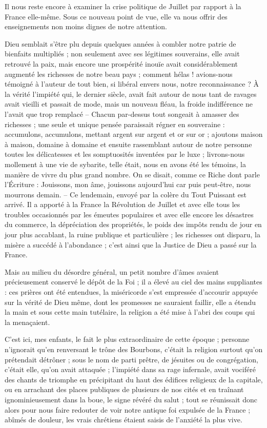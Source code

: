 \documentclass[11pt,a4paper]{report}
\begin{document}
Il nous reste encore à examiner la crise politique de Juillet par rapport à la France elle-même. Sous ce nouveau point de vue, elle va nous offrir des enseignements non moins dignes de notre attention.

Dieu semblait s'être plu depuis quelques années à combler notre patrie de bienfaits multipliés ; non seulement avec ses légitimes souverains, elle avait retrouvé la paix, mais encore une prospérité inouïe avait considérablement augmenté les richesses de notre beau pays ; comment hélas ! avions-nous témoigné à l'auteur de tout bien, si libéral envers nous, notre reconnaissance ? À la vérité l'impiété qui, le dernier siècle, avait fait autour de nous tant de ravages avait vieilli et passait de mode, mais un nouveau fléau, la froide indifférence ne l'avait que trop remplacé -- Chacun par-dessus tout songeait à amasser des richesses ; une seule et unique pensée paraissait régner en souveraine : accumulons, accumulons, mettant argent sur argent et or sur or ; ajoutons maison à maison, domaine à domaine et ensuite rassemblant autour de notre personne toutes les délicatesses et les somptuosités inventées par le luxe ; livrons-nous mollement à une vie de sybarite, telle était, nous en avons été les témoins, la manière de vivre du plus grand nombre. On se disait, comme ce Riche dont parle l'Écriture : Jouissons, mon âme, jouissons aujourd'hui car puis peut-être, nous mourrons demain. -- Ce lendemain, envoyé par la colère du Tout Puissant est arrivé. Il a apporté à la France la Révolution de Juillet et avec elle tous les troubles occasionnés par les émeutes populaires et avec elle encore les désastres du commerce, la dépréciation des propriétés, le poids des impôts rendu de jour en jour plus accablant, la ruine publique et particulière ; les richesses ont disparu, la misère a succédé à l'abondance ; c'est ainsi que la Justice de Dieu a passé sur la France.

Mais au milieu du désordre général, un petit nombre d'âmes avaient précieusement conservé le dépôt de la Foi ; il a élevé au ciel des mains suppliantes : ces prières ont été entendues, la miséricorde s'est empressée d'accourir appuyée sur la vérité de Dieu même, dont les promesses ne sauraient faillir, elle a étendu la main et sous cette main tutélaire, la religion a été mise à l'abri des coups qui la menaçaient.

C'est ici, mes enfants, le fait le plus extraordinaire de cette époque ; personne n'ignorait qu'en renversant le trône des Bourbons, c'était la religion surtout qu'on prétendait détrôner ; sous le nom de parti prêtre, de jésuites ou de congrégation, c'était elle, qu'on avait attaquée ; l'impiété dans sa rage infernale, avait vociféré des chants de triomphe en précipitant du haut des édifices religieux de la capitale, ou en arrachant des places publiques de plusieurs de nos cités et en traînant ignominieusement dans la boue, le signe révéré du salut ; tout se réunissait donc alors pour nous faire redouter de voir notre antique foi expulsée de la France ; abîmés de douleur, les vrais chrétiens étaient saisis de l'anxiété la plus vive.
\end{document}
